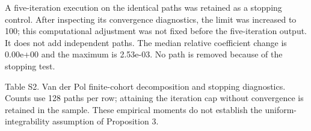\documentclass[
  american,
  11pt,
]{article}
\begin{document}
A five-iteration execution on the identical paths was retained as a
stopping control. After inspecting its convergence diagnostics, the
limit was increased to 100; this computational adjustment was not fixed
before the five-iteration output. It does not add independent paths. The
median relative coefficient change is 0.00e+00 and the maximum is
2.53e-03. No path is removed because of the stopping test.

\begin{center}
\begin{minipage}{\linewidth}
Table S2. Van der Pol finite-cohort decomposition and stopping
diagnostics. Counts use 128 paths per row; attaining the iteration cap
without convergence is retained in the sample. These empirical moments
do not establish the uniform-integrability assumption of Proposition 3.


\end{minipage}
\end{center}
\end{document}
